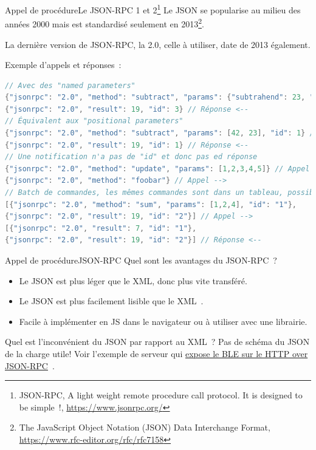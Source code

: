 \documentclass{beamer}
\begin{document}
    \begin{frame}[fragile]{Appel de procédure}{Le JSON-RPC 1 et 2\footnote{JSON-RPC, A light weight remote procedure call protocol. It is designed to be simple~!, \url{https://www.jsonrpc.org/}}}
        Le JSON se popularise au milieu des années 2000 mais est standardisé seulement en 2013\footnote{The JavaScript Object Notation (JSON) Data Interchange Format, \url{https://www.rfc-editor.org/rfc/rfc7158}}.

        La dernière version de JSON-RPC, la 2.0, celle à utiliser, date de 2013 également.

        Exemple d'appels et réponses~:
        \begin{lstlisting}[language=java,basicstyle=\ttfamily\tiny]
// Avec des "named parameters"
{"jsonrpc": "2.0", "method": "subtract", "params": {"subtrahend": 23, "minuend": 42}, "id": 3} // Appel -->
{"jsonrpc": "2.0", "result": 19, "id": 3} // Réponse <--
// Équivalent aux "positional parameters"
{"jsonrpc": "2.0", "method": "subtract", "params": [42, 23], "id": 1} // Appel -->
{"jsonrpc": "2.0", "result": 19, "id": 1} // Réponse <--
// Une notification n'a pas de "id" et donc pas ed réponse
{"jsonrpc": "2.0", "method": "update", "params": [1,2,3,4,5]} // Appel -->
{"jsonrpc": "2.0", "method": "foobar"} // Appel -->
// Batch de commandes, les mêmes commandes sont dans un tableau, possible pour les notifications également
[{"jsonrpc": "2.0", "method": "sum", "params": [1,2,4], "id": "1"},
{"jsonrpc": "2.0", "result": 19, "id": "2"}] // Appel -->
[{"jsonrpc": "2.0", "result": 7, "id": "1"},
{"jsonrpc": "2.0", "result": 19, "id": "2"}] // Réponse <--
        \end{lstlisting}
    \end{frame}

    \begin{frame}{Appel de procédure}{JSON-RPC}
        Quel sont les avantages du JSON-RPC~?
        \pause
        \bigbreak
        \begin{itemize}
            \item Le JSON est plus léger que le XML, donc plus vite transféré.
            \item Le JSON est plus facilement lisible que le XML~.
            \item Facile à implémenter en JS dans le navigateur ou à utiliser avec une librairie.
        \end{itemize}
        \bigbreak
        Quel est l'inconvénient du JSON par rapport au XML~?
        \pause
        \bigbreak
        Pas de schéma du JSON de la charge utile!
        \bigbreak
        Voir l'exemple de serveur qui \href{https://github.com/St-Michel-IT/testing/blob/master/ble_to_rpc.py}{expose le BLE sur le HTTP over JSON-RPC}~.
    \end{frame}
\end{document}
